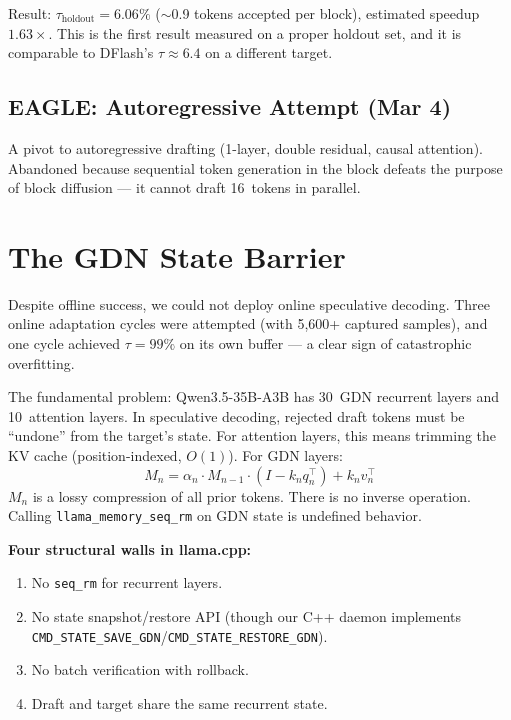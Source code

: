 \documentclass[10pt,a4paper]{article}
\begin{document}
Result: $\tau_{\text{holdout}}{=}6.06\%$ ($\sim$0.9 tokens accepted per block), estimated speedup $1.63{\times}$. This is the first result measured on a proper holdout set, and it is comparable to DFlash's $\tau{\approx}6.4$ on a different target.

\subsection{EAGLE: Autoregressive Attempt (Mar 4)}

A pivot to autoregressive drafting (1-layer, double residual, causal attention). Abandoned because sequential token generation in the block defeats the purpose of block diffusion --- it cannot draft 16~tokens in parallel.

\section{The GDN State Barrier}
\label{sec:barrier}

Despite offline success, we could not deploy online speculative decoding. Three online adaptation cycles were attempted (with 5{,}600+ captured samples), and one cycle achieved $\tau{=}99\%$ on its own buffer --- a clear sign of catastrophic overfitting.

The fundamental problem: Qwen3.5-35B-A3B has 30~GDN recurrent layers and 10~attention layers. In speculative decoding, rejected draft tokens must be ``undone'' from the target's state. For attention layers, this means trimming the KV cache (position-indexed, $O(1)$). For GDN layers:
\begin{equation}
  M_n = \alpha_n \cdot M_{n-1} \cdot (I - k_n q_n^\top) + k_n v_n^\top
\end{equation}
$M_n$ is a lossy compression of all prior tokens. There is no inverse operation. Calling \texttt{llama\_memory\_seq\_rm} on GDN state is undefined behavior.

\textbf{Four structural walls in llama.cpp:}
\begin{enumerate}
  \item No \texttt{seq\_rm} for recurrent layers.
  \item No state snapshot/restore API (though our C++ daemon implements \texttt{CMD\_STATE\_SAVE\_GDN}/\texttt{CMD\_STATE\_RESTORE\_GDN}).
  \item No batch verification with rollback.
  \item Draft and target share the same recurrent state.
\end{enumerate}
\end{document}
